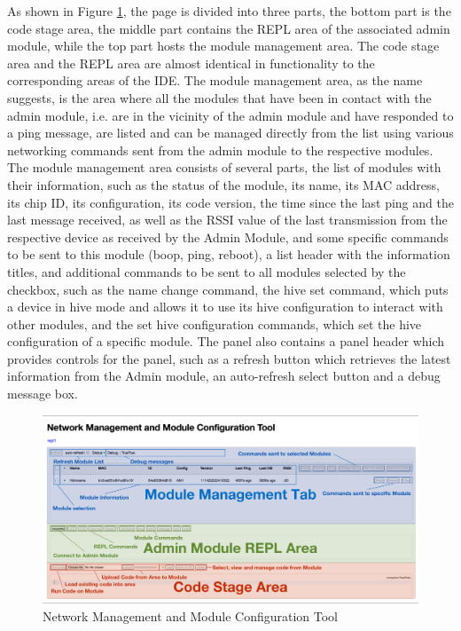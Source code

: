 As shown in Figure \ref{fig:nmmct}, the page is divided into three parts, the bottom part is the code stage area, the middle part contains the REPL area of the associated admin module, while the top part hosts the module management area. 
The code stage area and the REPL area are almost identical in functionality to the corresponding areas of the IDE. 
The module management area, as the name suggests, is the area where all the modules that have been in contact with the admin module, i.e. are in the vicinity of the admin module and have responded to a ping message, are listed and can be managed directly from the list using various networking commands sent from the admin module to the respective modules. The module management area consists of several parts, the list of modules with their information, such as the status of the module, its name, its MAC address, its chip ID, its configuration, its code version, the time since the last ping and the last message received, as well as the RSSI value of the last transmission from the respective device as received by the Admin Module, and some specific commands to be sent to this module (boop, ping, reboot), a list header with the information titles, and additional commands to be sent to all modules selected by the checkbox, such as the name change command, the hive set command, which puts a device in hive mode and allows it to use its hive configuration to interact with other modules, and the set hive configuration commands, which set the hive configuration of a specific module. The panel also contains a panel header which provides controls for the panel, such as a refresh button which retrieves the latest information from the Admin module, an auto-refresh select button and a debug message box.

\begin{figure}[H]
    \centering
    \includegraphics[width=\linewidth]{overleaf/images/nmmct.png}
    \vspace{\ftspace}
    \caption{Network Management and Module Configuration Tool}
    \vspace{\ftspace}
    \label{fig:nmmct}
\end{figure}

